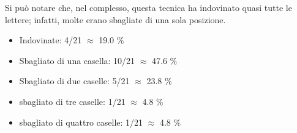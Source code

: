 \documentclass{report}
\begin{document}
Si può notare che, nel complesso, questa tecnica ha indovinato quasi tutte le lettere; infatti, molte erano sbagliate di una sola posizione.

\begin{itemize}
    \item Indovinate: 4/21 $\approx$ 19.0 \%
    \item Sbagliato di una casella: 10/21 $\approx$ 47.6 \%
    \item Sbagliato di due caselle: 5/21 $\approx$ 23.8 \%
    \item sbagliato di tre caselle: 1/21 $\approx$ 4.8 \%
    \item sbagliato di quattro caselle: 1/21 $\approx$ 4.8 \%
\end{itemize}
\end{document}
